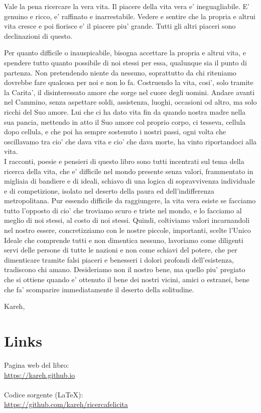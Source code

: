 Vale la pena ricercare la vera vita. Il piacere della vita vera e' ineguagliabile. E' genuino e ricco, e' raffinato e inarrestabile. Vedere e sentire che la propria e altrui vita cresce e poi fiorisce e' il piacere piu' grande. Tutti gli altri piaceri sono declinazioni di questo.

Per quanto difficile o inauspicabile, bisogna accettare la propria e altrui vita, e spendere tutto quanto possibile di noi stessi per essa, qualunque sia il punto di partenza. Non pretendendo niente da nessuno, soprattutto da chi riteniamo dovrebbe fare qualcosa per noi e non lo fa. Costruendo la vita, cosi', solo tramite la Carita', il disinteressato amore che sorge nel cuore degli uomini. Andare avanti nel Cammino, senza aspettare soldi, assistenza, luoghi, occasioni od altro, ma solo ricchi del Suo amore. Lui che ci ha dato vita fin da quando nostra madre nella sua pancia, mettendo in atto il Suo amore col proprio corpo, ci tesseva, cellula dopo cellula, e che poi ha sempre sostenuto i nostri passi, ogni volta che oscillavamo tra cio' che dava vita e cio' che dava morte, ha vinto riportandoci alla vita.\\

I racconti, poesie e pensieri di questo libro sono tutti incentrati sul tema della ricerca della vita, che e' difficile nel mondo presente senza valori, frammentato in migliaia di bandiere e di ideali, schiavo di una logica di sopravvivenza individuale e di competizione, isolato nel deserto della paura ed dell'indifferenza metropolitana. 
Pur essendo difficile da raggiungere, la vita vera esiste se facciamo tutto l'opposto di cio' che troviamo scuro e triste nel mondo, e lo facciamo al meglio di noi stessi, al costo di noi stessi. Quindi, coltiviamo valori incarnandoli nel nostro essere, concretizziamo con le nostre piccole, importanti, scelte l'Unico Ideale che comprende tutti e non dimentica nessuno, lavoriamo come diligenti servi delle persone di tutte le nazioni e non come schiavi del potere, che per dimenticare tramite falsi piaceri e benesseri i dolori profondi dell'esistenza, tradiscono chi amano. Desideriamo non il nostro bene, ma quello piu' pregiato che si ottiene quando e' ottenuto il bene dei nostri vicini, amici o estranei, bene che fa' scomparire immediatamente il deserto della solitudine.

\begin{flushright}
    \vspace*{\fill}
    Kareh, \finishDate
\end{flushright}

\section{Links}

Pagina web del libro:\\
\url{https://kareh.github.io}\\

\leavevmode\\
Codice sorgente (LaTeX):\\
\url{https://github.com/kareh/ricercafelicita}

